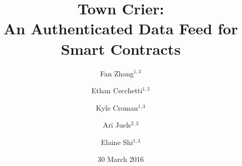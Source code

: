 \documentclass[letterpaper,twocolumn,10pt]{article}
\date{30 March 2016}
\title{\Large \bf Town Crier: \\ An Authenticated Data Feed for Smart Contracts}
\author{
{\rm Fan Zhang$^{1,3}$}
\and
{\rm Ethan Cecchetti$^{1,3}$}
\and
{\rm Kyle Croman$^{1,3}$}
\and
{\rm Ari Juels$^{2,3}$}
\and
{\rm Elaine Shi$^{1,3}$}
} %
\begin{document}
\maketitle
















{\footnotesize
  
  
}

\appendix 
%





%



\end{document}
